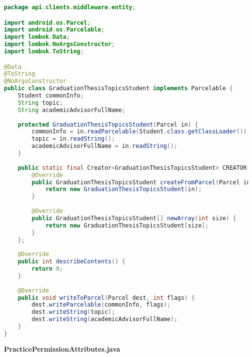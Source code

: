 \begin{lstlisting}[language=Java]
package api.clients.middleware.entity;

import android.os.Parcel;
import android.os.Parcelable;
import lombok.Data;
import lombok.NoArgsConstructor;
import lombok.ToString;

@Data
@ToString
@NoArgsConstructor
public class GraduationThesisTopicsStudent implements Parcelable {
	Student commonInfo;
	String topic;
	String academicAdvisorFullName;
	
	protected GraduationThesisTopicsStudent(Parcel in) {
		commonInfo = in.readParcelable(Student.class.getClassLoader());
		topic = in.readString();
		academicAdvisorFullName = in.readString();
	}
	
	public static final Creator<GraduationThesisTopicsStudent> CREATOR = new Creator<GraduationThesisTopicsStudent>() {
		@Override
		public GraduationThesisTopicsStudent createFromParcel(Parcel in) {
			return new GraduationThesisTopicsStudent(in);
		}
		
		@Override
		public GraduationThesisTopicsStudent[] newArray(int size) {
			return new GraduationThesisTopicsStudent[size];
		}
	};
	
	@Override
	public int describeContents() {
		return 0;
	}
	
	@Override
	public void writeToParcel(Parcel dest, int flags) {
		dest.writeParcelable(commonInfo, flags);
		dest.writeString(topic);
		dest.writeString(academicAdvisorFullName);
	}
}

\end{lstlisting}
\textbf{PracticePermissionAttributes.java}
